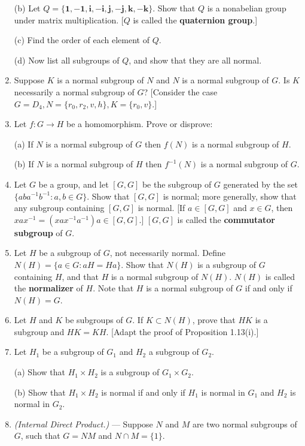 \documentclass[leqno]{book}
\begin{document}
\begin{enumerate}
(b) Let $Q=\{\mathbf 1,-\mathbf 1,\mathbf i,-\mathbf i,\mathbf j,-\mathbf j,\mathbf k,-\mathbf k\}$.  Show that $Q$ is a nonabelian group under matrix multiplication.  [$Q$ is called the \textbf{quaternion group}.]

(c) Find the order of each element of $Q$.

(d) Now list all subgroups of $Q$, and show that they are all normal.

\item Suppose $K$ is a normal subgroup of $N$ and $N$ is a normal subgroup of $G$.  Is $K$ necessarily a normal subgroup of $G$?  [Consider the case $G=D_4,N=\{r_0,r_2,v,h\},K=\{r_0,v\}$.]

\item Let $f:G\to H$ be a homomorphism.  Prove or disprove:

(a) If $N$ is a normal subgroup of $G$ then $f(N)$ is a normal subgroup of $H$.

(b) If $N$ is a normal subgroup of $H$ then $f^{-1}(N)$ is a normal subgroup of $G$.

\item Let $G$ be a group, and let $[G,G]$ be the subgroup of $G$ generated by the set $\{aba^{-1}b^{-1}:a,b\in G\}$.  Show that $[G,G]$ is normal; more generally, show that any subgroup containing $[G,G]$ is normal.  [If $a\in[G,G]$ and $x\in G$, then $xax^{-1}=(xax^{-1}a^{-1})a\in[G,G]$.]  $[G,G]$ is called the \textbf{commutator subgroup} of $G$.

\item Let $H$ be a subgroup of $G$, not necessarily normal.  Define $N(H)=\{a\in G:aH=Ha\}$.  Show that $N(H)$ is a subgroup of $G$ containing $H$, and that $H$ is a normal subgroup of $N(H)$.  $N(H)$ is called the \textbf{normalizer} of $H$.  Note that $H$ is a normal subgroup of $G$ if and only if $N(H)=G$.

\item Let $H$ and $K$ be subgroups of $G$.  If $K\subset N(H)$, prove that $HK$ is a subgroup and $HK=KH$.  [Adapt the proof of Proposition 1.13(i).]

\item Let $H_1$ be a subgroup of $G_1$ and $H_2$ a subgroup of $G_2$.

(a) Show that $H_1\times H_2$ is a subgroup of $G_1\times G_2$.

(b) Show that $H_1\times H_2$ is normal if and only if $H_1$ is normal in $G_1$ and $H_2$ is normal in $G_2$.

\item\emph{(Internal Direct Product.)} \---- Suppose $N$ and $M$ are two normal subgroups of $G$, such that $G=NM$ and $N\cap M=\{1\}$.


\end{enumerate}
\end{document}
